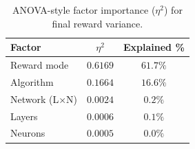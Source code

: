 \begin{table}[htbp]
\centering
\caption{ANOVA-style factor importance ($\eta^2$) for final reward variance.}
\label{tab:eta_squared}
\begin{tabular}{lcc}
\toprule
Factor & $\eta^2$ & Explained \% \\
\midrule
Reward mode & $0.6169$ & $61.7\%$ \\
Algorithm & $0.1664$ & $16.6\%$ \\
Network (L×N) & $0.0024$ & $0.2\%$ \\
Layers & $0.0006$ & $0.1\%$ \\
Neurons & $0.0005$ & $0.0\%$ \\
\bottomrule
\end{tabular}
\end{table}